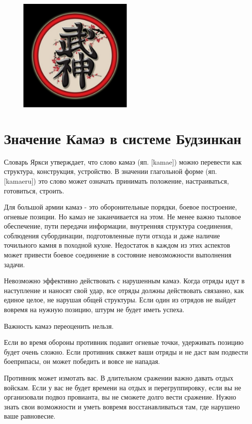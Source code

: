 \documentclass[russian,]{article}
\begin{document}
\begin{figure}
\centering
\includegraphics[width=0.5\textwidth]{x_5711c012.eps}
\end{figure}

\section{Значение Камаэ в системе Будзинкан}

Словарь Яркси утверждает, что слово камаэ (яп. [kamae]) можно перевести как структура, конструкция, устройство. В значении глагольной форме (яп. [kamaeru]) это слово может означать принимать положение, настраиваться, готовиться, строить.

Для большой армии камаэ - это оборонительные порядки, боевое построение, огневые позиции. Но камаэ не заканчивается на этом. Не менее важно тыловое обеспечение, пути передачи информации, внутренняя структура соединения, соблюдения субординации, подготовленные пути отхода и даже наличие точильного камня в походной кухне. Недостаток в каждом из этих аспектов может привести боевое соединение в состояние невозможности выполнения задачи.

Невозможно эффективно действовать с нарушенным камаэ. Когда отряды идут в наступление и наносят свой удар, все отряды должны действовать связанно, как единое целое, не нарушая общей структуры. Если один из отрядов не выйдет вовремя на нужную позицию, штурм не будет иметь успеха.

Важность камаэ переоценить нельзя.

Если во время обороны противник подавит огневые точки, удерживать позицию будет очень сложно. Если противник свяжет ваши отряды и не даст вам подвести боеприпасы, он может победить и вовсе не нападая.

Противник может измотать вас. В длительном сражении важно давать отдых войскам. Если у вас не будет времени на отдых и перегруппировку, если вы не организовали подвоз провианта, вы не сможете долго вести сражение. Нужно знать свои возможности и уметь вовремя восстанавливаться там, где нарушено ваше равновесие.
\end{document}

